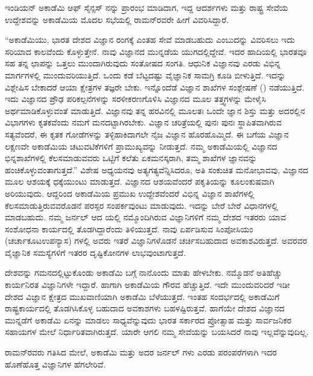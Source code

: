 ಇಂಡಿಯನ್ ಅಕಾಡೆಮಿ ಆಫ್ ಸೈನ್ಸಸ್ ನನ್ನು ಪ್ರಾರಂಭ ಮಾಡಿದಾಗ, ಇದ್ದ ಆದರ್ಶಗಳು ಮತ್ತು ರಾಷ್ಟ್ರ ಸೇವೆಯ ಉದ್ದೇಶವನ್ನು ಅಕಾಡೆಮಿಯ ಮೊದಲ ಸಭೆಯಲ್ಲಿ ರಾಮನ್‍ರವರೇ ಹೀಗೆ ವಿವರಿಸಿದ್ದಾರೆ.

“ಅಕಾಡೆಮಿಯು, ಭಾರತ ದೇಶದ ವಿಜ್ಞಾನ ರಂಗಕ್ಕೆ ಎಂತಹ ಸೇವೆ ಮಾಡಬಹುದು ಎಂಬುದನ್ನು ವಿವರಿಸಲು ಇದು ಸರಿಯಾದ ಕಾಲವೆಂದು ಕೊಳ್ಳುತ್ತೇನೆ. ನಾವು ವಿಜ್ಞಾನದ ಮುನ್ನಡೆಯ ಯುಗದಲ್ಲಿದ್ದೇವೆ. ಇದರ ಹಾದಿಯಲ್ಲಿ ಭಾರತವೂ ಸಹ ತನ್ನ ಛಾಪನ್ನು ಒತ್ತಲು ಮುಂದಾಗಿರುವುದು ಸಂತೋಷದ ಸಂಗತಿ. ಆಧುನಿಕ ವಿಜ್ಞಾನವು ಎರಡು ವಿಭಿನ್ನ ಮಾರ್ಗಗಳಲ್ಲಿ ಮುಂದುವರಿಯುತ್ತಿದೆ. ಒಂದು ಕಡೆ ಬೆಟ್ಟದಷ್ಟು ವೈಜ್ಞಾನಿಕ ಸಾಮಗ್ರಿ ಕೂಡಿ ಬೀಳುತ್ತಿದೆ. ಇದನ್ನು ವಿಶ್ಲೇಷಿಸ ಬೇಕಾದರೆ ಆಯಾ ಕ್ಷೇತ್ರಗಳ ತಜ್ಞರೇ ಬೇಕು. ಇನ್ನೊಂದೆಡೆ ವಿಜ್ಞಾನ ಶಾಖೆಗಳ ಸಂಶ್ಲೇಷಣೆ () ನಡೆಯುತ್ತಿದೆ. ಇದು ವಿಜ್ಞಾನದ ಪ್ರೌಢ ಪರಿಕಲ್ಪನೆಗಳನ್ನು ಸರಳೀಕರಣಗೊಳಿಸಿ ವಿಜ್ಞಾನದ ಮೂಲ ತತ್ತ್ವಗಳನ್ನು ಮೇಳೈಸಿ ಅರ್ಥಮಾಡಿಕೊಳ್ಳುವಂತೆ ಮಾಡುತ್ತಿದೆ. ವಿಜ್ಞಾನವು ತನ್ನ ಹರವಿನಲ್ಲಿ ಮೂಲತಃ ಒಂದೇ ಜ್ಞಾನ ಶಿಸ್ತು ಮತ್ತು ಅದರಲ್ಲಿನ ವಿಭಾಗಗಳು ಕೃತಕವೆಂದು ನಮಗೆ ಮನದಟ್ಟಾಗಿರಬೇಕು. ವಿಜ್ಞಾನ ಚರಿತ್ರೆಯಲ್ಲಿ ಪುನಃ ಪುನಃ ಸ್ಥಾಪಿತವಾಗಿರುವ ಸತ್ಯವೆಂದರೆ, ಈ ಕೃತಕ ಗೋಡೆಗಳನ್ನು ತಳ್ಳಿಹಾಕಿದಾಗಲೇ ನೈಜ ವಿಜ್ಞಾನ ಹೊರಹೊಮ್ಮಿದೆ. ಈ ಬಗೆಯ ವಿಜ್ಞಾನ ಲಕ್ಷಣವೇ ಅಕಾಡೆಮಿಯ ಚಟುವಟಿಕೆಗಳಿಗೆ ಪ್ರಾಮುಖ್ಯವನ್ನು ನೀಡುತ್ತದೆ. ನಮ್ಮ ಅಕಾಡೆಮಿಯಲ್ಲಿ ವಿಜ್ಞಾನದ ಭಿನ್ನಶಾಖೆಗಳಲ್ಲಿ ಕೆಲಸಮಾಡುವವರು ಒಟ್ಟಿಗೆ ಕಲೆತು ಏಕಮನಸ್ಕರಾಗಿ, ತಮ್ಮ ಶಾಖೆಗಳ ಜ್ಞಾನವನ್ನು ಹಂಚಿಕೊಳ್ಳುವಂತಾ\-ಗುತ್ತದೆ.” ವಿಶೇಷ ಅಧ್ಯಯನವು ಅತ್ಯಗತ್ಯವೆನ್ನಿಸಿದರೂ, ಅತಿ ಸಂಕುಚಿತ ಮನೋಭಾವವು, ವಿಜ್ಞಾನದ ಮೂಲ ಆಶಯಕ್ಕೆ ಧಕ್ಕೆಯುಂಟು ಮಾಡುತ್ತದೆ. ವಿಜ್ಞಾನದ ಆಶಯವೆಂದರೆ ಪಕೃತಿಯನ್ನು ಕೂಲಂಕುಷವಾಗಿ ಅರಿಯುವುದು. ಆದ್ದರಿಂದ ಅಕಾಡೆಮಿಯ ಪ್ರಮುಖ ಉದ್ದೇಶವೆಂದರೆ ವಿಭಿನ್ನ ವಿಜ್ಞಾನ ಶಾಖೆಗಳಲ್ಲಿ ಕೆಲಸಮಾಡುತ್ತಿರುವವರೊಡನೆ ಪರಸ್ಪರ ಸಂಪರ್ಕವುಂಟು ಮಾಡುವುದು. ಇದನ್ನು ಬೇರೆ ಬೇರೆ ವಿಧಾನಗಳಲ್ಲಿ ಮಾಡಬಹುದು. ನಮ್ಮ ಜರ್ನಲ್ ಆದ \textit{} ಯಲ್ಲಿ ನಮ್ಮೊಂದಿಗಿರುವ ವಿಜ್ಞಾನಿಗಳಿಗೆ ನಮ್ಮ ದೇಶದ ಇತರರು ಯಾವ ಸಂಶೋಧನಾ ಕಾರ್ಯದಲ್ಲಿ ತೊಡಗಿದ್ದಾರೆಂದು ತಿಳಿಯುತ್ತದೆ. ನಾವು ಏರ್ಪಡಿಸುವ ಸಿಂಪೋಸಿಯಂ (ಚರ್ಚಾಕೂಟಉಪನ್ಯಾಸ) ಗಳಲ್ಲಿ ಅವರು ಇತರೆ ವಿಜ್ಞಾನಿಗಳೊಡನೆ ಚರ್ಚಿಸಬಹುದಾದ ಅವಕಾಶವಿರುತ್ತದೆ. ಅವರವರ ವೈಜ್ಞಾನಿಕ ಸಮಸ್ಯೆಗಳಿಗೆ ಇತರರ ದೃಷ್ಟಿಕೋನಗಳ ಲಾಭವುಂಟಾಗುತ್ತದೆ.

ದೇಶವನ್ನು ಗಮನದಲ್ಲಿಟ್ಟುಕೊಂಡು ಅಕಾಡೆಮಿ ಬಗ್ಗೆ ನಾನೊಂದು ಮಾತು ಹೇಳಬೇಕು. ನಮ್ಮೊಡನೆ ಅತಿಹೆಚ್ಚು ಕಾರ್ಯನಿರತ ವಿಜ್ಞಾನಿಗಳೇ ಇದ್ದಾರೆ. ಹಾಗಾಗಿ ಅಕಾಡೆಮಿಯ ಗೌರವ ಹೆಚ್ಚುತ್ತಿದೆ. ಇದೇ ಮುಂದುವರಿದರೆ ಇಡೀ ದೇಶದ ವಿಜ್ಞಾನ ಕ್ಷೇತ್ರದ ಮುಖವಾಣಿಯಾಗಿ ಅಕಾಡೆಮಿ ಬೆಳೆಯುತ್ತದೆ. ಇಂತಹ ಸಂದರ್ಭದಲ್ಲಿ ಅಕಾಡೆಮಿಗೆ ರಾಷ್ಟ್ರಕಾರ್ಯದಲ್ಲಿ ತೊಡಗಿಸಿಕೊಳ್ಳ ಬಹುದಾದ ಅವಕಾಶಗಳು ಬಹಳಷ್ಟಿರುತ್ತವೆ. ಹಾಗೆಯೇ ದೇಶದ ವಿಜ್ಞಾನದ ಮುನ್ನಡೆಗೆ ಅಕಾಡೆಮಿ ಏನನ್ನು ಮಾಡಲು ಸಾಧ್ಯವೆನ್ನುವುದು ಭಾರತ ಸರ್ಕಾರದ ಪ್ರೋತ್ಸಾಹ ಮತ್ತು ಸಾರ್ವಜನಿಕರ ಸಹಾಯಗಳ ಮೇಲೆ ನಿರ್ಧಾರಿತವಾಗಿರುತ್ತದೆ. ಯಾರೇ ಆಗಲಿ ನಮ್ಮ ಸೇವೆಯನ್ನು ಬಯಸಿದರೆ ನಾವು ಇಲ್ಲವೆನ್ನುವುದಿಲ್ಲ.

ರಾಮನ್‍ರವರು ಗತಿಸಿದ ಮೇಲೆ, ಅಕಾಡೆಮಿ ಮತ್ತು ಅದರ ಜರ್ನಲ್  ಗಳು ಎರಡು ಪರಂಪರೆಗಳಾಗಿ ಇದರ ಹೊಣೆಹೊತ್ತ ವಿಜ್ಞಾನಿಗಳ ಹೆಗಲೇರಿವೆ.

